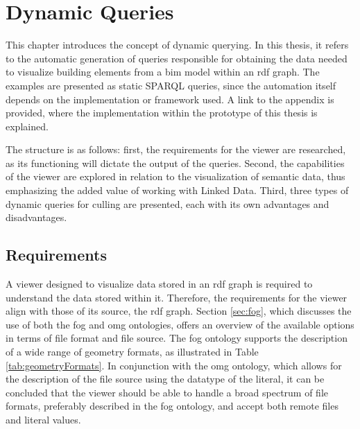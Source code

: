 \chapter{Dynamic Queries}
This chapter introduces the concept of dynamic querying. In this thesis, it refers to the automatic generation of queries responsible for obtaining the data needed to visualize building elements from a \ac{bim} model within an \ac{rdf} graph. The examples are presented as static SPARQL queries, since the automation itself depends on the implementation or framework used. A link to the appendix is provided, where the implementation within the prototype of this thesis is explained.

The structure is as follows: first, the requirements for the viewer are researched, as its functioning will dictate the output of the queries. Second, the capabilities of the viewer are explored in relation to the visualization of semantic data, thus emphasizing the added value of working with Linked Data. Third, three types of dynamic queries for culling are presented, each with its own advantages and disadvantages.

\section{Requirements}
A viewer designed to visualize data stored in an \ac{rdf} graph is required to understand the data stored within it. Therefore, the requirements for the viewer align with those of its source, the \ac{rdf} graph. Section \ref{sec:fog}, which discusses the use of both the \ac{fog} and \ac{omg} ontologies, offers an overview of the available options in terms of file format and file source. The \ac{fog} ontology supports the description of a wide range of geometry formats, as illustrated in Table \ref{tab:geometryFormats}. In conjunction with the \ac{omg} ontology, which allows for the description of the file source using the datatype of the literal, it can be concluded that the viewer should be able to handle a broad spectrum of file formats, preferably described in the \ac{fog} ontology, and accept both remote files and literal values.

